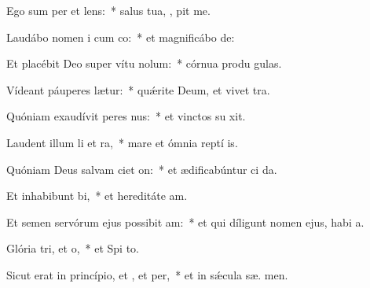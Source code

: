 \item Ego sum per et lens:~* salus tua, , pit me.
\item Laudábo nomen i cum co:~* et magnificábo   de:
\item Et placébit Deo super vítu nolum:~* córnua produ  gulas.
\item Vídeant páuperes  lætur:~* quǽrite Deum, et vivet  tra.
\item Quóniam exaudívit peres nus:~* et vinctos su  xit.
\item Laudent illum li et ra,~* mare et ómnia reptí  is.
\item Quóniam Deus salvam ciet on:~* et ædificabúntur ci da.
\item Et inhabibunt bi,~* et hereditáte  am.
\item Et semen servórum ejus possibit am:~* et qui díligunt nomen ejus, habi  a.
\item Glória tri, et o,~* et Spi to.
\item Sicut erat in princípio, et , et per,~* et in sǽcula sæ. men.
